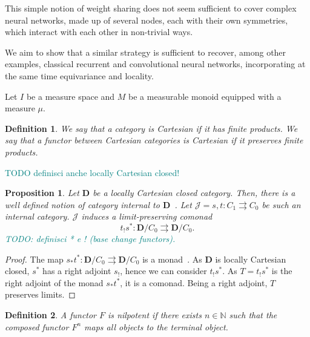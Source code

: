 \documentclass[12pt]{article}
\newtheorem{definition}{Definition}
\newtheorem{proposition}{Proposition}
\newcommand{\pietro}[1]{\textcolor{teal}{#1}}
\newcommand{\N}{{\mathbb{N}}}
\newcommand{\DCat}{{\mathbf{D}}}
\newcommand{\JCat}{{\mathcal{J}}}
\begin{document}
This simple notion of weight sharing does not seem sufficient to cover complex neural networks, made up of several nodes, each with their own symmetries, which interact with each other in non-trivial ways.

We aim to show that a similar strategy is sufficient to recover, among other examples, classical recurrent and convolutional neural networks, incorporating at the same time equivariance and locality.

Let $I$ be a measure space and $M$ be a measurable monoid equipped with a measure $\mu$.

\begin{definition}\label{def:cartesian_category}
    We say that a category is {\em Cartesian} if it has finite products. We say that a functor between Cartesian categories is {\em Cartesian} if it preserves finite products.
\end{definition}

\pietro{TODO definisci anche locally Cartesian closed!}

\begin{proposition}\label{prop:internal_category_comonad}
    Let $\DCat$ be a locally Cartesian closed category. Then, there is a well defined notion of category {\em internal} to $\DCat$~\cite{mac2013categories}.
    Let $\JCat = s, t \colon C_1 \rightrightarrows C_0$ be such an internal category. $\JCat$ induces a limit-preserving comonad
    \begin{equation*}
        t_!s^*\colon \DCat/C_0 \rightrightarrows \DCat/C_0.
    \end{equation*}
    \pietro{TODO: definisci * e ! (base change functors).}
\end{proposition}

\begin{proof}
    The map $s_*t^*\colon \DCat/C_0 \rightrightarrows \DCat/C_0$ is a monad~\cite[Thm.~V.8.2]{Mac_Lane_1994}. As $\DCat$ is locally Cartesian closed, $s^*$ has a right adjoint $s_!$, hence we can consider $t_!s^*$. As $T = t_!s^*$ is the right adjoint of the monad $s_*t^*$, it is a comonad. Being a right adjoint, $T$ preserves limits.
\end{proof}

\begin{definition}\label{def:nilpotent_functor}
    A functor $F$ is {\em nilpotent} if there exists $n \in \N$ such that the composed functor $F^n$ maps all objects to the terminal object.
\end{definition}
\end{document}

